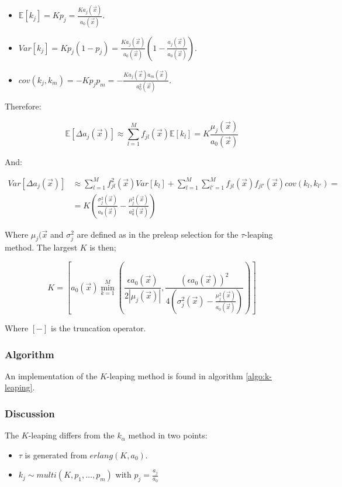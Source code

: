     \begin{itemize}
      \item $\mathbb{E}[k_j] = Kp_j = \frac{Ka_j(\vec{x})}{a_0(\vec{x})}$.
      \item $Var[k_j] = Kp_j(1-p_j) = \frac{Ka_j(\vec{x})}{a_0(\vec{x})}\left(1-\frac{a_j(\vec{x})}{a_0(\vec{x})}\right)$.
      \item $cov(k_j, k_m) = -Kp_jp_m = -\frac{Ka_j(\vec{x})a_m(\vec{x})}{a_0^2(\vec{x})}$.
    \end{itemize}

    Therefore:

    $$\mathbb{E}[\Delta a_j(\vec{x})] \approx\sum\limits_{l=1}^Mf_{jl}(\vec{x})\mathbb{E}[k_l] = K\frac{\mu_j(\vec{x})}{a_0(\vec{x})}$$

    And:

    \begin{align*}
      Var[\Delta a_j(\vec{x})] &\approx \sum\limits_{l=1}^Mf_{jl}^2(\vec{x})Var[k_l] + \sum\limits_{l=1}^M\sum\limits_{l'=1}^Mf_{jl}(\vec{x})f_{jl'}(\vec{x})cov(k_l, k_{l'}) = \\
                               &= K\left(\frac{\sigma_j^2(\vec{x})}{a_0(\vec{x})}-\frac{\mu_j^2(\vec{x})}{a_0^2(\vec{x})}\right)
    \end{align*}

    Where $\mu_j(\vec{x}$ and $\sigma_j^2$ are defined as in the preleap selection for the $\tau$-leaping method.
    The largest $K$ is then;

    $$K = \left[a_0(\vec{x})\min\limits_{k=1}^M\left(\frac{\epsilon a_0(\vec{x})}{2|\mu_j(\vec{x})|}, \frac{(\epsilon a_0(\vec{x}))^2}{4(\sigma_j^2(\vec{x})-\frac{\mu_j^2(\vec{x})}{a_0(\vec{x})})}\right)\right]$$

    Where $[-]$ is the truncation operator.

    \subsubsection{Algorithm}
    An implementation of the $K$-leaping method is found in algorithm \ref{algo:k-leaping}.

    

    \subsubsection{Discussion}
    The $K$-leaping differs from the $k_\alpha$ method in two points:

    \begin{multicols}{2}
      \begin{itemize}
        \item $\tau$ is generated from $erlang(K, a_0)$.
      \item $k_j\sim multi(K, p_1, \dots, p_m)$ with $p_j = \frac{a_j}{a_0}$
      \end{itemize}
    \end{multicols}

